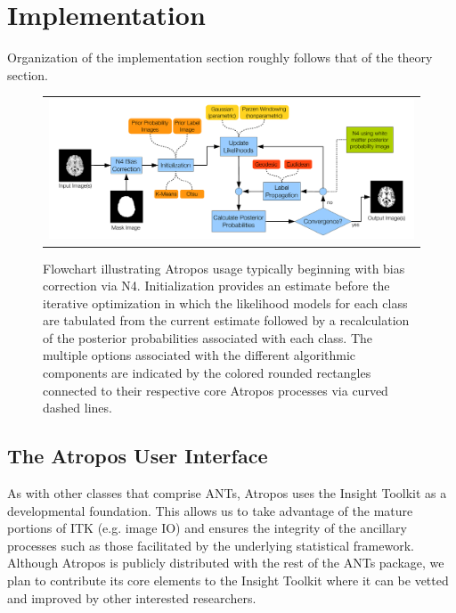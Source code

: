 \documentclass[11pt,english]{article}
\begin{document}
\section{Implementation} 
Organization of the implementation section roughly follows that of the
theory section.  
\begin{figure}
\begin{center}
\begin{tabular}{c}
\includegraphics[width=160mm]{AtroposFlowchart.pdf}
\end{tabular}
\caption{\baselineskip 12pt \small Flowchart illustrating Atropos usage typically beginning with bias correction via N4.  
Initialization provides an estimate before the iterative optimization in which the 
likelihood models for each class are tabulated from the current estimate followed by a recalculation of the 
posterior probabilities associated with each class.  The multiple options associated with the different algorithmic 
components are indicated by the colored rounded rectangles connected to their respective core Atropos 
processes via curved dashed lines.  }
\label{fig:flowchart}
\end{center}
\end{figure}
\subsection{The Atropos User Interface}
As with other classes that comprise ANTs, Atropos uses the Insight
Toolkit as a developmental foundation.  This allows us to take
advantage of the mature portions of ITK (e.g. image IO) and ensures
the integrity of the ancillary processes such as those facilitated by
the underlying statistical framework.  Although Atropos is publicly
distributed with the rest of the ANTs package, we plan to contribute
its core elements to the Insight Toolkit where it can be vetted and improved by other interested researchers.
\end{document}
